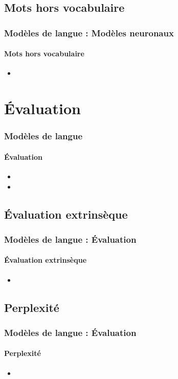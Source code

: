 \documentclass[xcolor=table]{beamer}
\begin{document}
\subsection{Mots hors vocabulaire}

\begin{frame}
\frametitle{Modèles de langue : Modèles neuronaux}
\framesubtitle{Mots hors vocabulaire}

\begin{itemize}
	\item 
\end{itemize}

\end{frame}

\section{Évaluation}

\begin{frame}
\frametitle{Modèles de langue}
\framesubtitle{Évaluation}

\begin{itemize}
	\item {}
	\item {}
\end{itemize}

\end{frame}

\subsection{Évaluation extrinsèque}

\begin{frame}
\frametitle{Modèles de langue : Évaluation}
\framesubtitle{Évaluation extrinsèque}

\begin{itemize}
	\item 
\end{itemize}

\end{frame}

\subsection{Perplexité}

\begin{frame}
\frametitle{Modèles de langue : Évaluation}
\framesubtitle{Perplexité}

\begin{itemize}
	\item 
\end{itemize}

\end{frame}

\end{document}
